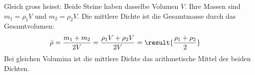Gleich gross heisst: Beide Steine haben dasselbe Volumen $V$. Ihre Massen sind $m_1 = \rho_1 V$ und $m_2 = \rho_2 V$. Die mittlere Dichte ist die Gesamtmasse durch das Gesamtvolumen:
\begin{align}
 \bar\rho &= \frac{m_1+m_2}{2V} = \frac{\rho_1 V+\rho_2 V}{2V} = \result{\frac{\rho_1+\rho_2}{2}}
\end{align}
Bei gleichen Volumina ist die mittlere Dichte das arithmetische Mittel der beiden Dichten.
